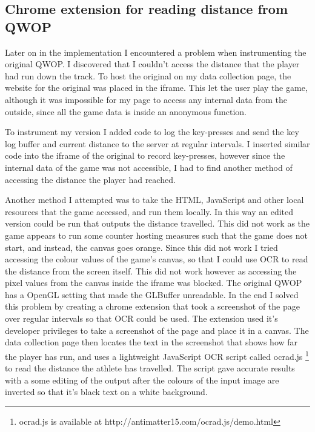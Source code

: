 \documentclass[12pt,a4paper,twoside,openright]{report}
\begin{document}
\subsection{Chrome extension for reading distance from QWOP}
\label{sec:chromeExtension}


Later on in the implementation I encountered a problem when instrumenting the original QWOP. I discovered that I couldn't access the distance that the player had run down the track.
To host the original on my data collection page, the website for the original was placed in the iframe. This let the user play the game, although it was impossible for my page to access any internal data from the outside, since all the game data is inside an anonymous function.

To instrument my version I added code to log the key-presses and send the key log buffer and current distance to the server at regular intervals. I inserted similar code into the iframe of the original to record key-presses, however since the internal data of the game was not accessible, I had to find another method of accessing the distance the player had reached.

Another method I attempted
was to take the HTML, JavaScript and other local resources that the game accessed, and run them locally. In this way an edited version could be run that outputs the distance travelled.
This did not work as the game appears to run some counter hosting measures such that the game does not start, and instead, the canvas goes orange.
Since this did not work I tried accessing the colour values of the game's canvas, so that I could use OCR to read the distance from the screen itself. This did not work however as accessing the pixel values from the canvas inside the iframe was blocked. The original QWOP has a OpenGL setting that made the GLBuffer unreadable.
In the end I solved this problem by creating a chrome extension that took a screenshot of the page over regular intervals so that OCR could be used.
The extension used it's developer privileges to take a screenshot of the page and place it in a canvas. The data collection page then locates the text in the screenshot that shows how far the player has run, and uses a lightweight JavaScript OCR script called ocrad.js
\footnote{ocrad.js is available at http://antimatter15.com/ocrad.js/demo.html} to read the distance the athlete has travelled.
The script gave accurate results with a some editing of the output after the colours of the input image are inverted so that it's black text on a white background.
\end{document}
